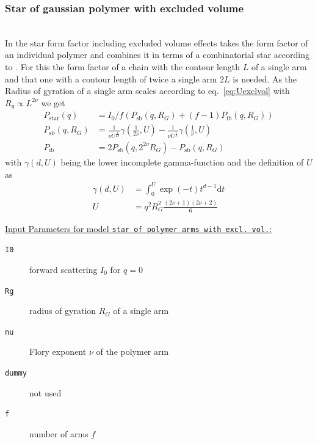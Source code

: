 \subsubsection{Star of gaussian polymer with excluded volume}
\label{sect:StarGaussianExvol}
~\\
In \cite{Hammouda2016} the star form factor including excluded volume effects takes the form factor of an individual polymer and combines it in terms of a combinatorial star according to \cite{Huber1989}. For this the form factor of a chain with the contour length $L$ of a single arm and that one with a contour length  of twice a single arm $2L$ is needed. As the Radius of gyration of a single arm scales according to eq.\ \ref{eq:Uexclvol} with $R_g \propto L^{2\nu}$ we get
\begin{align}
 P_\mathrm{star}(q) &= I_0/f\left(P_\mathrm{sb}(q,R_G) + (f-1)P_\mathrm{ib}(q,R_G) \right) \\
 P_\mathrm{sb}(q,R_G) &= \frac{1}{\nu U^{\frac{1}{2\nu}}}\gamma\left(\frac{1}{2\nu},U\right) -
 \frac{1}{\nu U^{\frac{1}{\nu}}}\gamma\left(\frac{1}{\nu},U\right)\\
 P_\mathrm{ib} &= 2P_\mathrm{sb}(q,2^{2\nu}R_G)-P_\mathrm{sb}(q,R_G)
\end{align}
with $\gamma(d,U)$ being the lower incomplete gamma-function and the definition of $U$ as
\begin{align}
\gamma(d,U) &= \int_0^U \exp(-t) t^{d-1}\mathrm{d}t \\
U &= q^2R_G^2\frac{(2\nu+1)(2\nu+2)}{6}
\end{align}

\vspace{5mm}

\noindent
\underline{Input Parameters for model \texttt{star of polymer arms with excl. vol.}:}
\begin{description}
\item[\texttt{I0}] forward scattering $I_0$ for $q=0$
\item[\texttt{Rg}] radius of gyration $R_G$ of a single arm
\item[\texttt{nu}] Flory exponent $\nu$ of the polymer arm
\item[\texttt{dummy}] not used
\item[\texttt{f}] number of arms $f$
\end{description}


